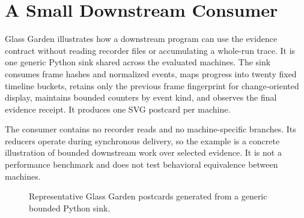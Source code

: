 \section{A Small Downstream Consumer}
\label{sec:glass-garden}

Glass Garden illustrates how a downstream program can use the evidence
contract without reading recorder files or accumulating a whole-run trace.
It is one generic Python sink shared across the evaluated machines. The sink
consumes frame hashes and normalized events, maps progress into twenty fixed
timeline buckets, retains only the previous frame fingerprint for
change-oriented display, maintains bounded counters by event kind, and
observes the final evidence receipt. It produces one SVG postcard per machine.

The consumer contains no recorder reads and no machine-specific branches.
Its reducers operate during synchronous delivery, so the example is a
concrete illustration of bounded downstream work over selected evidence. It
is not a performance benchmark and does not test behavioral equivalence
between machines.

\begin{figure}[t]
  \centering
  \PaperPlaceholderFigure{4cm}{\TBAGardenFigure}
  \caption{Representative Glass Garden postcards generated from a generic
  bounded Python sink. \TBAGardenCaption}
  \label{fig:glass-garden}
\end{figure}
